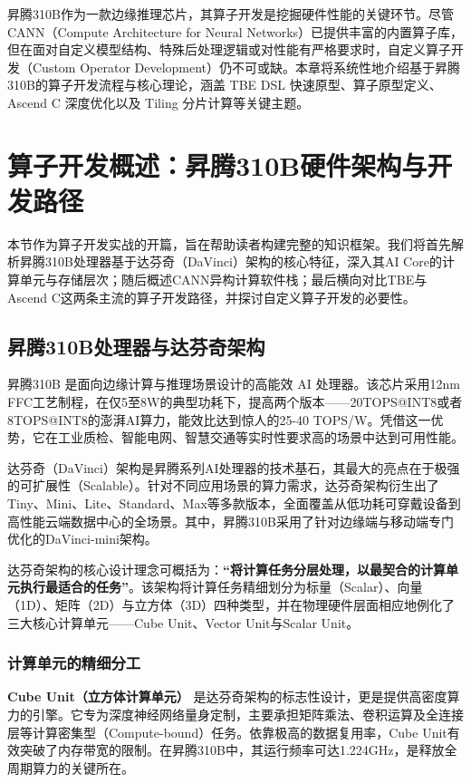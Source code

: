 昇腾310B作为一款边缘推理芯片，其算子开发是挖掘硬件性能的关键环节。尽管CANN（Compute
Architecture for Neural
Networks）已提供丰富的内置算子库，但在面对自定义模型结构、特殊后处理逻辑或对性能有严格要求时，自定义算子开发（Custom
Operator
Development）仍不可或缺。本章将系统性地介绍基于昇腾310B的算子开发流程与核心理论，涵盖
TBE DSL 快速原型、算子原型定义、Ascend C 深度优化以及 Tiling
分片计算等关键主题。

\section{算子开发概述：昇腾310B硬件架构与开发路径}\label{src-book-chapter7-h1}

本节作为算子开发实战的开篇，旨在帮助读者构建完整的知识框架。我们将首先解析昇腾310B处理器基于达芬奇（DaVinci）架构的核心特征，深入其AI
Core的计算单元与存储层次；随后概述CANN异构计算软件栈；最后横向对比TBE与Ascend
C这两条主流的算子开发路径，并探讨自定义算子开发的必要性。

\subsection{昇腾310B处理器与达芬奇架构}\label{src-book-chapter7-h2}

昇腾310B 是面向边缘计算与推理场景设计的高能效 AI 处理器。该芯片采用12nm
FFC工艺制程，在仅5至8W的典型功耗下，提高两个版本------20TOPS@INT8或者8TOPS@INT8的澎湃AI算力，能效比达到惊人的25-40
TOPS/W。凭借这一优势，它在工业质检、智能电网、智慧交通等实时性要求高的场景中达到可用性能。

达芬奇（DaVinci）架构是昇腾系列AI处理器的技术基石，其最大的亮点在于极强的可扩展性（Scalable）。针对不同应用场景的算力需求，达芬奇架构衍生出了Tiny、Mini、Lite、Standard、Max等多款版本，全面覆盖从低功耗可穿戴设备到高性能云端数据中心的全场景。其中，昇腾310B采用了针对边缘端与移动端专门优化的DaVinci-mini架构。

达芬奇架构的核心设计理念可概括为：\textbf{``将计算任务分层处理，以最契合的计算单元执行最适合的任务''}。该架构将计算任务精细划分为标量（Scalar）、向量（1D）、矩阵（2D）与立方体（3D）四种类型，并在物理硬件层面相应地例化了三大核心计算单元------Cube
Unit、Vector Unit与Scalar Unit。

\subsubsection{计算单元的精细分工}\label{src-book-chapter7-h3}

\textbf{Cube Unit（立方体计算单元）}
是达芬奇架构的标志性设计，更是提供高密度算力的引擎。它专为深度神经网络量身定制，主要承担矩阵乘法、卷积运算及全连接层等计算密集型（Compute-bound）任务。依靠极高的数据复用率，Cube
Unit有效突破了内存带宽的限制。在昇腾310B中，其运行频率可达1.224GHz，是释放全周期算力的关键所在。

